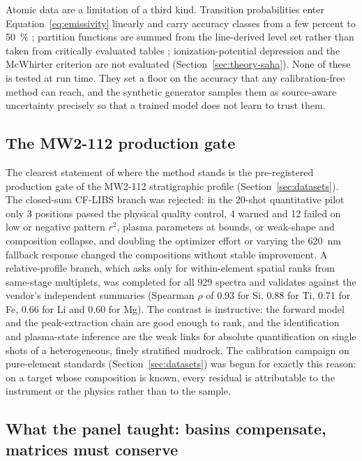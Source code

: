 Atomic data are a limitation of a third kind. Transition probabilities enter
Equation~\eqref{eq:emissivity} linearly and carry accuracy classes from a few percent
to \SI{50}{\percent} \citep{kramida2023asd,fuhr2006fe}; partition functions are
summed from the line-derived level set rather than taken from critically evaluated
tables \citep{barklem2016partition}; ionization-potential depression and the
McWhirter criterion are not evaluated (Section~\ref{sec:theory-saha}). None of these
is tested at run time. They set a floor on the accuracy that any calibration-free
method can reach, and the synthetic generator samples them as source-aware
uncertainty precisely so that a trained model does not learn to trust them.

\subsection{The MW2-112 production gate}

The clearest statement of where the method stands is the pre-registered production
gate of the MW2-112 stratigraphic profile (Section~\ref{sec:datasets}). The
closed-sum CF-LIBS branch was rejected: in the 20-shot quantitative pilot only 3
positions passed the physical quality control, 4 warned and 12 failed on low or
negative pattern $r^2$, plasma parameters at bounds, or weak-shape and composition
collapse, and doubling the optimizer effort or varying the \SI{620}{\nano\meter}
fallback response changed the compositions without stable improvement.
A relative-profile branch, which asks only for within-element spatial ranks from
same-stage multiplets, was completed for all 929 spectra and validates against the
vendor's independent summaries (Spearman $\rho$ of 0.93 for Si, 0.88 for Ti, 0.71 for
Fe, 0.66 for Li and 0.60 for Mg).
The contrast is instructive: the forward model and the peak-extraction chain are
good enough to rank, and the identification and plasma-state inference are the
weak links for absolute quantification on single shots of a heterogeneous,
finely stratified mudrock. The calibration campaign on pure-element standards
(Section~\ref{sec:datasets}) was begun for exactly this reason: on a target whose
composition is known, every residual is attributable to the instrument or the
physics rather than to the sample.

\subsection{What the panel taught: basins compensate, matrices must conserve}


